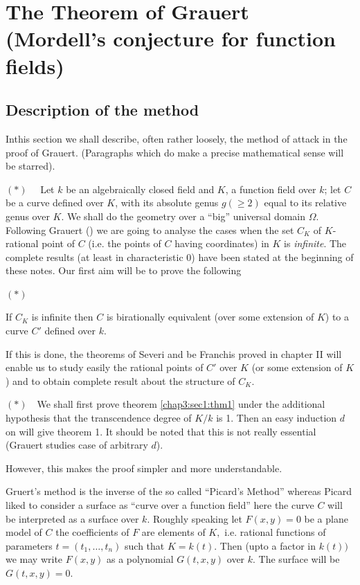 \chapter[The Theorem of Grauert...]{The Theorem of Grauert (Mordell's conjecture for
  function fields)}\label{chap3} 

\section{Description of the method}\label{chap3:sec1}%

In\pageoriginale this section we shall describe, often rather loosely,  the method
of attack in the proof of Grauert. (Paragraphs which do make a precise
mathematical sense will be starred). 

\noindent 
$(\ast)$~~ Let $k$ be an algebraically closed field and $K$, a
function field over $k$; let $C$ be a curve defined over $K$,  with
its absolute genus $g(\ge 2)$ equal to its relative genus over $K$. We
shall do the  geometry over a ``big'' universal domain
$\Omega$. Following Grauert (\cite{2}) we are going to analyse the cases
when the set $C_K$ of $K$- rational point of $C$ (i.e. the points of
$C$ having coordinates) in $K$ is \textit{infinite}.  The complete
results (at least in characteristic $0$) have been stated at the
beginning of these notes. Our first aim will be to prove the following  

\noindent $(\ast)$ ~ 
  \setcounter{theorem}{0}
  \begin{theorem}\label{chap3:sec1:thm1}%
    If $C_K$ is infinite then $C$ is birationally equivalent (over some
    extension of $K$) to a curve $C'$ defined over $k$.  
  \end{theorem}


If this is done, the theorems of Severi and be Franchis proved in
chapter II will enable us to study easily the rational points  of
$C'$ over $K$ (or some extension of $K$) and to obtain complete result
about the structure of $C_K$. 

\noindent
$(\ast)$~~\pageoriginale We shall first prove theorem \ref{chap3:sec1:thm1} under the additional
hypothesis that the transcendence degree of $K/k$ is 1. Then an easy
induction $d$ on will give theorem 1. It should be noted that this is
not really essential (Grauert studies case of arbitrary $d$). 

However, this makes the proof simpler and more understandable.

Gruert's method is the inverse of the so called ``Picard's Method''
whereas Picard liked to consider  a surface as  ``curve over a
function field'' here the curve $C$ will be interpreted as a surface
over $k$. Roughly speaking let $F(x,y) =0$ be a plane model of $C$ the
coefficients of $F$ are elements of $K,$ i.e. rational functions of
parameters $t=(t_1,\ldots,t_n)$ such that $K=k(t)$. Then (upto a
factor in $k(t))$ we may write $F(x,y)$ as a polynomial $G(t,x,y)$
over $k$. The surface will be $G(t,x,y)=0$. 


